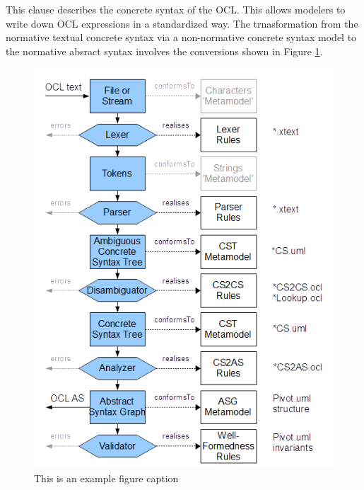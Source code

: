 \documentclass{scrreprt}   %
\begin{document}

\label{ocl:AbstractSyntax}


\label{ocl:ConcreteSyntax}

This clause describes the concrete syntax of the OCL. This allows modelers to write down OCL expressions in a standardized way. The trnasformation from the normative textual concrete syntax via a non-normative concrete syntax model to the normative absract syntax involves the conversions shown in Figure \ref{ocl:Conversions}.

\begin{figure}
  \begin{center}
    \includegraphics[width=4.5in]{Conversions.png}
  \end{center}
  \centering
  \caption{This is an example figure caption}\label{ocl:Conversions}
\end{figure}
\end{document}

